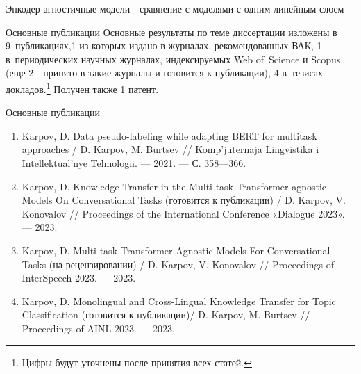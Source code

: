 \begin{frame}{Энкодер-агностичные модели - сравнение с моделями с одним линейным слоем}
\begin{frame}{Основные публикации}
 Основные результаты по теме диссертации изложены в 9~публикациях,{1} из которых издано в журналах, рекомендованных ВАК, {1} в~периодических научных журналах, индексируемых Web of~Science и Scopus (еще 2 - принято в такие журналы и готовится к публикации), {4} в~тезисах докладов.\footnote{Цифры будут уточнены после принятия всех статей.} Получен также 1 патент.
\end{frame}
\begin{frame}{Основные публикации}
\begin{enumerate}
 \item Karpov, D. Data pseudo-labeling while adapting BERT for multitask
approaches  / D. Karpov, M. Burtsev // Komp’juternaja
Lingvistika i Intellektual’nye Tehnologii. — 2021. — С. 358—366.
\item  Karpov, D. Knowledge Transfer in the Multi-task Transformer-agnostic
Models On Conversational Tasks (готовится к публикации) /
D. Karpov, V. Konovalov // Proceedings of the International Conference
«Dialogue 2023». — 2023.
\item Karpov, D. Multi-task Transformer-Agnostic Models For Conversational
Tasks (на рецензировании) / D. Karpov, V. Konovalov //
Proceedings of InterSpeech 2023. — 2023.
\item Karpov, D. Monolingual and Cross-Lingual Knowledge Transfer for
Topic Classification (готовится к публикации)/ D. Karpov,
M. Burtsev // Proceedings of AINL 2023. — 2023.
\end{enumerate}
\end{frame}


\end{frame}
